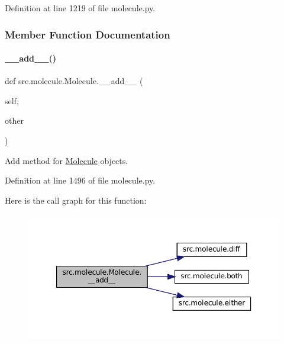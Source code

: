 Definition at line 1219 of file molecule.\+py.



\subsubsection{Member Function Documentation}
\mbox{\label{classsrc_1_1molecule_1_1Molecule_a087212040303a4f62a3462106428cc38}} 
\paragraph{\texorpdfstring{\+\_\+\+\_\+add\+\_\+\+\_\+()}{\_\_add\_\_()}}
{\footnotesize\ttfamily def src.\+molecule.\+Molecule.\+\_\+\+\_\+add\+\_\+\+\_\+ (\begin{DoxyParamCaption}\item[{}]{self,  }\item[{}]{other }\end{DoxyParamCaption})}



Add method for \hyperlink{classsrc_1_1molecule_1_1Molecule}{Molecule} objects. 



Definition at line 1496 of file molecule.\+py.

Here is the call graph for this function\+:
\nopagebreak
\begin{figure}[H]
\begin{center}
\leavevmode
\includegraphics[width=350pt]{classsrc_1_1molecule_1_1Molecule_a087212040303a4f62a3462106428cc38_cgraph}
\end{center}
\end{figure}
\mbox{\label{classsrc_1_1molecule_1_1Molecule_ac40e3fd2c1f79e316be59016e7dfd253}} 
